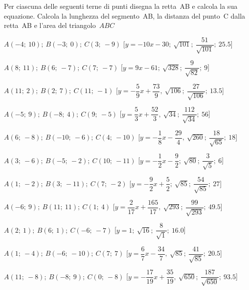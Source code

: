 \begin{esercizio}\label{ese:}
 Per ciascuna delle seguenti terne di 
punti disegna la retta~AB e calcola la sua equazione. 
Calcola la lunghezza del segmento~AB, la distanza del punto~C dalla retta~AB 
e l'area del triangolo~$ABC$
 \begin{enumeratea}
  \item  $A(-4;~10);~B(-3;~0);~C(3;~-9)$ \hfill 
   [$y=-10 x -30;~\sqrt{101};~\dfrac{51}{\sqrt{101}};~25.5$]
  \item  $A(8;~11);~B(6;~-7);~C(7;~-7)$ \hfill 
   [$y=9 x -61;~\sqrt{328};~\dfrac{9}{\sqrt{82}};~9$]
  \item  $A(11;~2);~B(2;~7);~C(11;~-1)$ \hfill 
   [$y=-\dfrac{5}{9} x +\dfrac{73}{9},
     ~\sqrt{106};~\dfrac{27}{\sqrt{106}};~13.5$]
  \item  $A(-5;~9);~B(-8;~4);~C(9;~-5)$ \hfill 
   [$y=\dfrac{5}{3} x+\dfrac{52}{3},
     ~\sqrt{34};~\dfrac{112}{\sqrt{34}};~56$]
  \item  $A(6;~-8);~B(-10;~-6);~C(4;~-10)$ \hfill 
   [$y=-\dfrac{1}{8} x-\dfrac{29}{4},
     ~\sqrt{260};~\dfrac{18}{\sqrt{65}};~18$]
  \item  $A(3;~-6);~B(-5;~-2);~C(10;~-11)$ \hfill 
   [$y=-\dfrac{1}{2} x -\dfrac{9}{2};~\sqrt{80};~\dfrac{3}{\sqrt{5}};~6$]
  \item  $A(1;~-2);~B(3;~-11);~C(7;~-2)$ \hfill 
   [$y=-\dfrac{9}{2} x +\dfrac{5}{2};~\sqrt{85};~\dfrac{54}{\sqrt{85}};~27$]
  \item  $A(-6;~9);~B(11;~11);~C(1;~4)$ \hfill 
   [$y=\dfrac{2}{17} x+\dfrac{165}{17},
     ~\sqrt{293};~\dfrac{99}{\sqrt{293}};~49.5$]
  \item  $A(2;~1);~B(6;~1);~C(-6;~-7)$ \hfill 
   [$y=1;~\sqrt{16};~\dfrac{8}{\sqrt{1}};~16.0$]
  \item  $A(1;~-4);~B(-6;~-10);~C(7;~7)$ \hfill 
   [$y=\dfrac{6}{7} x-\dfrac{34}{7},
     ~\sqrt{85};~\dfrac{41}{\sqrt{85}};~20.5$]
  \item  $A(11;~-8);~B(-8;~9);~C(0;~-8)$ \hfill 
   [$y=-\dfrac{17}{19} x+\dfrac{35}{19},
     ~\sqrt{650};~\dfrac{187}{\sqrt{650}};~93.5$]

\end{enumeratea}
\end{esercizio}
